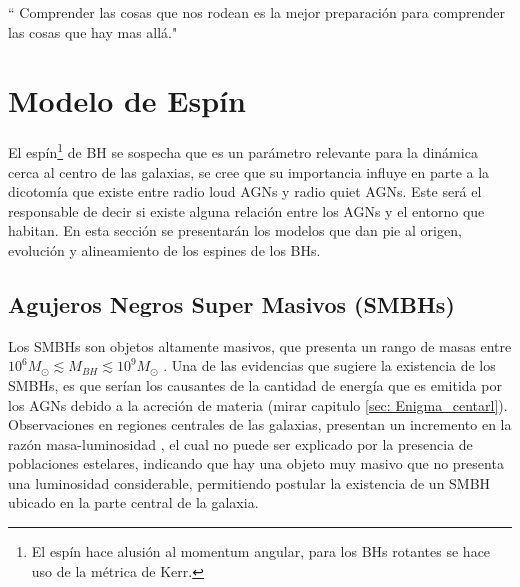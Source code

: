 \begin{savequote}[50mm]
`` Comprender las cosas que nos rodean es la mejor preparación para comprender las cosas que hay mas allá."
\end{savequote}




\chapter{Modelo de Espín}
\label{cha:Modelo de Spin}

El espín\footnote{El espín hace alusión al momentum angular, para los BHs rotantes se hace uso de la métrica de Kerr.} de BH se sospecha que es un parámetro relevante para la dinámica cerca al centro de las galaxias, se cree que su importancia influye en parte a la dicotomía que existe entre radio loud AGNs y radio quiet AGNs. Este será el responsable de decir si existe alguna relación entre los AGNs y el entorno que habitan. En esta sección se presentarán los modelos que dan pie al origen, evolución y  alineamiento de los espines de los BHs.

\section{Agujeros Negros Super Masivos (SMBHs)}
\label{sec: SMBH}
Los SMBHs son objetos altamente masivos, que presenta un rango de masas entre $10^6M_{\odot}\lesssim M_{BH} \lesssim 10^{9}M_{\odot}$ \cite{mo2010}. Una de las evidencias que sugiere la existencia de los SMBHs, es que serían los causantes de la cantidad de energía que es emitida por los AGNs debido a la acreción de materia (mirar capitulo \ref{sec: Enigma_centarl}). Observaciones en regiones centrales de las galaxias, presentan un incremento en la razón masa-luminosidad \cite{schneider2006}, el cual no puede ser explicado por la presencia de poblaciones estelares, indicando que hay una objeto muy masivo que no presenta una luminosidad considerable, permitiendo postular la existencia de un SMBH ubicado en la parte central de la galaxia.  

